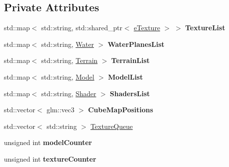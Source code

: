 \subsection*{Private Attributes}
\begin{DoxyCompactItemize}
\item 
std\+::map$<$ std\+::string, std\+::shared\+\_\+ptr$<$ \hyperlink{classe_texture}{e\+Texture} $>$ $>$ {\bfseries Texture\+List}\hypertarget{class_resource_manager_a2b386cfa7cb2d3bf15eb6354888b8e67}{}\label{class_resource_manager_a2b386cfa7cb2d3bf15eb6354888b8e67}

\item 
std\+::map$<$ std\+::string, \hyperlink{class_water}{Water} $>$ {\bfseries Water\+Planes\+List}\hypertarget{class_resource_manager_a3b28e4995ea477def6e7d1d101466317}{}\label{class_resource_manager_a3b28e4995ea477def6e7d1d101466317}

\item 
std\+::map$<$ std\+::string, \hyperlink{class_terrain}{Terrain} $>$ {\bfseries Terrain\+List}\hypertarget{class_resource_manager_a3e13d8ba49d868e8a0c57e7d1f04f6ea}{}\label{class_resource_manager_a3e13d8ba49d868e8a0c57e7d1f04f6ea}

\item 
std\+::map$<$ std\+::string, \hyperlink{class_model}{Model} $>$ {\bfseries Model\+List}\hypertarget{class_resource_manager_a2f9a6979889cf6d913bbb6aa5af7f993}{}\label{class_resource_manager_a2f9a6979889cf6d913bbb6aa5af7f993}

\item 
std\+::map$<$ std\+::string, \hyperlink{class_shader}{Shader} $>$ {\bfseries Shaders\+List}\hypertarget{class_resource_manager_a828322cfec867ce19af8eb249e0c23b2}{}\label{class_resource_manager_a828322cfec867ce19af8eb249e0c23b2}

\item 
std\+::vector$<$ glm\+::vec3 $>$ {\bfseries Cube\+Map\+Positions}\hypertarget{class_resource_manager_ae88330d471df1f1da98de27dbfd3b084}{}\label{class_resource_manager_ae88330d471df1f1da98de27dbfd3b084}

\item 
std\+::vector$<$ std\+::string $>$ \hyperlink{class_resource_manager_a9e21ce059a8812bb3afe957f75a3120b}{Texture\+Queue}
\item 
unsigned int {\bfseries model\+Counter}\hypertarget{class_resource_manager_ab4f1e2253295104d9a93ec8ca26816e4}{}\label{class_resource_manager_ab4f1e2253295104d9a93ec8ca26816e4}

\item 
unsigned int {\bfseries texture\+Counter}\hypertarget{class_resource_manager_a88d9b4bc80f4e31ea4eb9956a85f1b79}{}\label{class_resource_manager_a88d9b4bc80f4e31ea4eb9956a85f1b79}

\end{DoxyCompactItemize}


